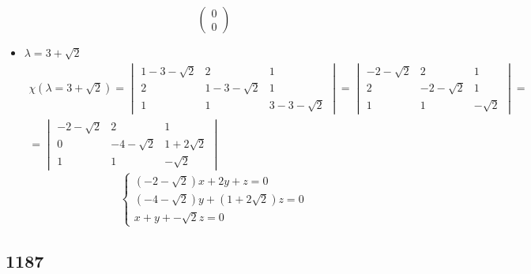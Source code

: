\begin{itemize}
$$\begin{pmatrix}
        0 \\
        0
    \end{pmatrix} $$
    \item $ \lambda = 3 + \sqrt2 $
    \begin{multline*}
        \chi(\lambda = 3 + \sqrt2) =
        \begin{vmatrix}
            1 - 3 - \sqrt2 & 2 & 1 \\
            2 & 1 - 3 - \sqrt2 & 1 \\
            1 & 1 & 3 - 3 - \sqrt2
        \end{vmatrix} =
        \begin{vmatrix}
            -2 - \sqrt2 & 2 & 1 \\
            2 & -2 - \sqrt2 & 1 \\
            1 & 1 & -\sqrt2
        \end{vmatrix} = \\
        =
        \begin{vmatrix}
            -2 - \sqrt2 & 2 & 1 \\
            0 & -4 - \sqrt2 & 1 + 2\sqrt2 \\
            1 & 1 & -\sqrt2
        \end{vmatrix}
    \end{multline*}
    $$
    \begin{cases}
    	(-2 - \sqrt2)x + 2y + z = 0 \\
        (-4 - \sqrt2)y + (1 + 2\sqrt2)z = 0 \\
        x + y + -\sqrt2z = 0
    \end{cases} $$
\end{itemize}

\subsection{1187}

